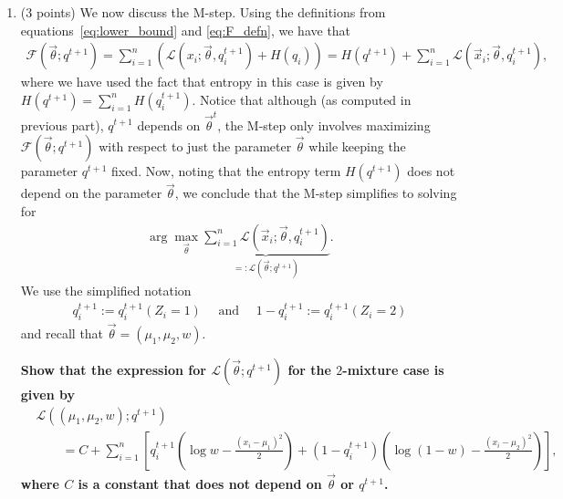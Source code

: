 \documentclass[11pt]{article}
\begin{document}
\begin{enumerate}[label=(\alph*)]
\item (3 points) 
We now discuss the M-step. Using the definitions from equations~\eqref{eq:lower_bound} and \eqref{eq:F_defn}, we have that
\begin{align*}
  \mathcal{F}(\vec{\theta}; q^{t+1}) = 
  \sum_{i=1}^n(\mathcal{L}(x_i; \vec\theta, q_i^{t+1})
    + H(q_i))
  = H(q^{t+1}) + \sum_{i=1}^n\mathcal{L}(\vec x_i; \vec\theta, q_i^{t+1}),
\end{align*}
where we have used the fact that entropy in this case is given by $H(q^{t+1}) = \sum_{i=1}^nH(q_i^{t+1})$.
Notice that although (as computed in previous part), $q^{t+1}$ depends
on $\vec\theta^t$, the M-step only involves maximizing $\mathcal{F}(\vec{\theta}; q^{t+1})$
with respect to just the parameter $\vec\theta$ while keeping the 
parameter $q^{t+1}$ fixed.
Now, noting that the entropy term $H(q^{t+1})$ does not depend on 
the parameter $\vec\theta$, we conclude that the M-step simplifies to solving for
\begin{align*}
  \arg\max_{\vec\theta} \underbrace{\sum_{i=1}^n\mathcal{L}(\vec x_i; \vec\theta, q_i^{t+1})}_{=:\mathcal{L}(\vec{\theta}; q^{t+1})} .
\end{align*}
We use the simplified notation
\begin{align*}
  q^{t+1}_i:= q_i^{t+1}(Z_i=1) \quad\text{ and } \quad  
  1-q^{t+1}_i:= q_i^{t+1}(Z_i=2)
\end{align*}
and recall that $\vec \theta = (\mu_1, \mu_2, w)$.

{\bf Show that the expression for $\mathcal{L}(\vec{\theta}; q^{t+1})$ for the $2$-mixture case is given by
\begin{align*}
  &\mathcal{L}((\mu_1, \mu_2, w); q^{t+1}) \\
  &\quad\quad=  C + \sum_{i=1}^n\left[q^{t+1}_i  \left(\log w-
  \frac{(x_i-\mu_1)^2}{2}\right) + (1-q_i^{t+1}) 
  \left(\log(1-w)-\frac{(x_i-\mu_2)^2}{2}\right)\right],
\end{align*}
where $C$ is a constant that does not depend on $\vec\theta$ or $q^{t+1}$.}


\end{enumerate}
\end{document}
